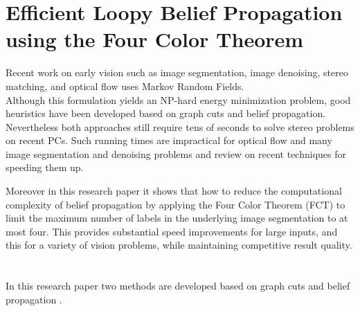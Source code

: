 \section{Efficient Loopy Belief Propagation using the Four Color Theorem}
Recent work on early vision such as image segmentation, image  denoising, stereo matching, and optical flow uses Markov Random Fields.\\ Although this formulation yields an NP-hard energy minimization problem, good heuristics have been developed based on graph cuts and belief propagation.\\ Nevertheless both approaches still require tens of seconds to solve stereo problems on recent PCs. Such running times are impractical for optical flow and many image segmentation and
denoising problems and review on  recent techniques for speeding them up.

Moreover in this research paper it shows that  how to reduce the computational complexity of belief propagation by applying the Four Color Theorem (FCT) to limit the maximum number of labels in the underlying image segmentation to at most four. This provides substantial speed improvements for large inputs, and this for a variety of vision problems, while maintaining competitive result quality.
\\\\\\ In this research paper two methods are developed based on graph cuts  and belief propagation .

